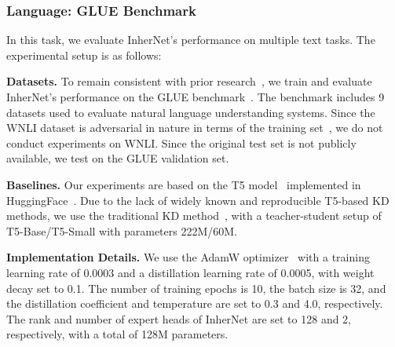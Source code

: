 \documentclass{article} %
\begin{document}
\subsubsection{Language: GLUE Benchmark}
In this task, we evaluate InherNet's performance on multiple text tasks. The experimental setup is as follows:

\textbf{Datasets.} To remain consistent with prior research~\citep{raffel2019exploring}, we train and evaluate InherNet's performance on the GLUE benchmark~\citep{wang2018glue}. The benchmark includes 9 datasets used to evaluate natural language understanding systems. Since the WNLI dataset is adversarial in nature in terms of the training set~\citep{raffel2019exploring, devlin2019bert}, we do not conduct experiments on WNLI. Since the original test set is not publicly available, we test on the GLUE validation set.

\textbf{Baselines.} Our experiments are based on the T5 model~\citep{raffel2019exploring} implemented in HuggingFace~\citep{wolf-etal2020transformers}. Due to the lack of widely known and reproducible T5-based KD methods, we use the traditional KD method~\citep{hinton2015distilling}, with a teacher-student setup of T5-Base/T5-Small with parameters 222M/60M.

\textbf{Implementation Details.} We use the AdamW optimizer~\citep{loshchilov2017decoupled} with a training learning rate of 0.0003 and a distillation learning rate of 0.0005, with weight decay set to 0.1. The number of training epochs is 10, the batch size is 32, and the distillation coefficient and temperature are set to 0.3 and 4.0, respectively. The rank and number of expert heads of InherNet are set to 128 and 2, respectively, with a total of 128M parameters.
\end{document}

